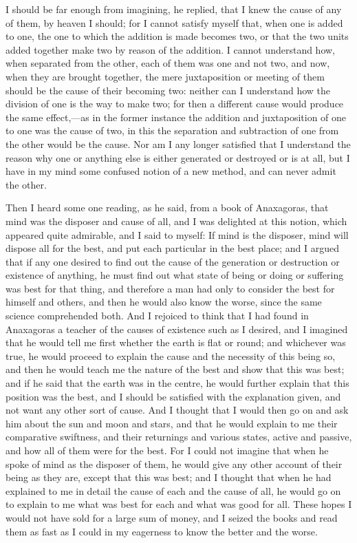 \documentclass[11pt,letter]{article}
\begin{document}
\par  I should be far enough from imagining, he replied, that I knew the cause of any of them, by heaven I should; for I cannot satisfy myself that, when one is added to one, the one to which the addition is made becomes two, or that the two units added together make two by reason of the addition. I cannot understand how, when separated from the other, each of them was one and not two, and now, when they are brought together, the mere juxtaposition or meeting of them should be the cause of their becoming two: neither can I understand how the division of one is the way to make two; for then a different cause would produce the same effect,—as in the former instance the addition and juxtaposition of one to one was the cause of two, in this the separation and subtraction of one from the other would be the cause. Nor am I any longer satisfied that I understand the reason why one or anything else is either generated or destroyed or is at all, but I have in my mind some confused notion of a new method, and can never admit the other.

\par  Then I heard some one reading, as he said, from a book of Anaxagoras, that mind was the disposer and cause of all, and I was delighted at this notion, which appeared quite admirable, and I said to myself: If mind is the disposer, mind will dispose all for the best, and put each particular in the best place; and I argued that if any one desired to find out the cause of the generation or destruction or existence of anything, he must find out what state of being or doing or suffering was best for that thing, and therefore a man had only to consider the best for himself and others, and then he would also know the worse, since the same science comprehended both. And I rejoiced to think that I had found in Anaxagoras a teacher of the causes of existence such as I desired, and I imagined that he would tell me first whether the earth is flat or round; and whichever was true, he would proceed to explain the cause and the necessity of this being so, and then he would teach me the nature of the best and show that this was best; and if he said that the earth was in the centre, he would further explain that this position was the best, and I should be satisfied with the explanation given, and not want any other sort of cause. And I thought that I would then go on and ask him about the sun and moon and stars, and that he would explain to me their comparative swiftness, and their returnings and various states, active and passive, and how all of them were for the best. For I could not imagine that when he spoke of mind as the disposer of them, he would give any other account of their being as they are, except that this was best; and I thought that when he had explained to me in detail the cause of each and the cause of all, he would go on to explain to me what was best for each and what was good for all. These hopes I would not have sold for a large sum of money, and I seized the books and read them as fast as I could in my eagerness to know the better and the worse.
\end{document}
